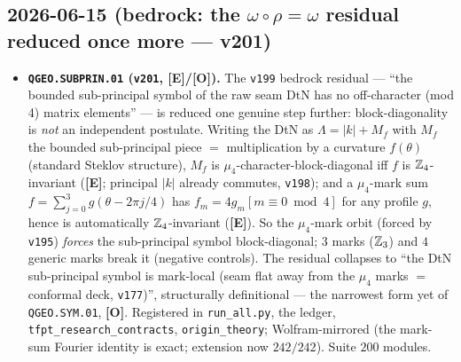 \documentclass[11pt]{article}
\providecommand{\mE}{\textbf{[E]}}\providecommand{\mC}{\textbf{[C]}}
\providecommand{\mO}{\textbf{[O]}}\providecommand{\mX}{\textbf{[X]}}
\providecommand{\vref}[1]{\texttt{#1}}
\begin{document}
\subsection*{2026-06-15 (bedrock: the $\omega\circ\rho=\omega$ residual reduced once more --- v201)}
\begin{itemize}
\item \textbf{\texttt{QGEO.SUBPRIN.01} (\vref{v201}, \mE/\mO).} The \vref{v199} bedrock residual --- ``the
  bounded sub-principal symbol of the raw seam DtN has no off-character (mod 4) matrix elements'' --- is
  reduced one genuine step further: block-diagonality is \emph{not} an independent postulate. Writing the
  DtN as $\Lambda=|k|+M_f$ with $M_f$ the bounded sub-principal piece $=$ multiplication by a curvature
  $f(\theta)$ (standard Steklov structure), $M_f$ is $\mu_4$-character-block-diagonal iff $f$ is
  $\mathbb{Z}_4$-invariant (\mE; principal $|k|$ already commutes, \vref{v198}); and a $\mu_4$-mark sum
  $f=\sum_{j=0}^3 g(\theta-2\pi j/4)$ has $f_m=4g_m[m\equiv0\bmod4]$ for any profile $g$, hence is
  automatically $\mathbb{Z}_4$-invariant (\mE). So the $\mu_4$-mark orbit (forced by \vref{v195}) \emph{forces} the
  sub-principal symbol block-diagonal; $3$ marks ($\mathbb{Z}_3$) and $4$ generic marks break it (negative
  controls). The residual collapses to ``the DtN sub-principal symbol is mark-local (seam flat away from the
  $\mu_4$ marks $=$ conformal deck, \vref{v177})'', structurally definitional --- the narrowest form yet of
  \texttt{QGEO.SYM.01}, \mO. Registered in \texttt{run\_all.py}, the ledger, \texttt{tfpt\_research\_contracts},
  \texttt{origin\_theory}; Wolfram-mirrored (the mark-sum Fourier identity is exact; extension now
  $242/242$). Suite $200$ modules.
\end{itemize}
\end{document}
